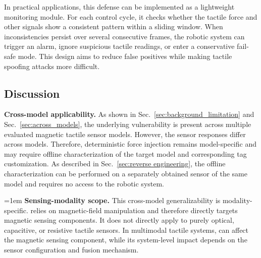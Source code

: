 In practical applications, this defense can be implemented as a lightweight monitoring module. 
For each control cycle, it checks whether the tactile force and other signals show a consistent pattern within a sliding window. 
When inconsistencies persist over several consecutive frames, the robotic system can trigger an alarm, ignore suspicious tactile readings, or enter a conservative fail-safe mode. 
This design aims to reduce false positives while making tactile spoofing attacks more difficult.

\subsection{
Discussion
}


\noindent\textbf{Cross-model applicability.}
As shown in Sec.~\ref {sec:background_limitation} and Sec.~\ref {sec:across_models}, the underlying vulnerability is present across multiple evaluated magnetic tactile sensor models. However, the sensor responses differ across models. Therefore, deterministic force injection remains model-specific and may require offline characterization of the target model and corresponding tag customization. As described in Sec.~\ref {sec:reverse engineering}, the offline characterization can be performed on a separately obtained sensor of the same model and requires no access to the robotic system.


{\emergencystretch=1em
\noindent\textbf{Sensing-modality scope.}
This cross-model generalizability is modality-specific. {\name} relies on magnetic-field manipulation and therefore directly targets magnetic sensing components. It does not directly apply to purely optical, capacitive, or resistive tactile sensors. In multimodal tactile systems, {\name} can affect the magnetic sensing component, while its system-level impact depends on the sensor configuration and fusion mechanism.

\par}
